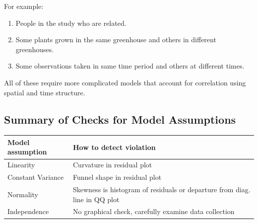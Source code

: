 \documentclass[]{book}
\providecommand{\tightlist}{%
  \setlength{\itemsep}{0pt}\setlength{\parskip}{0pt}}
\begin{document}
For example:

\begin{enumerate}
\def\labelenumi{\arabic{enumi}.}
\tightlist
\item
  People in the study who are related.\\
\item
  Some plants grown in the same greenhouse and others in different
  greenhouses.\\
\item
  Some observations taken in same time period and others at different
  times.
\end{enumerate}

All of these require more complicated models that account for
correlation using spatial and time structure.

\subsection{Summary of Checks for Model
Assumptions}\label{summary-of-checks-for-model-assumptions}

\begin{longtable}[]{@{}ll@{}}
\toprule
\begin{minipage}[b]{0.16\columnwidth}\raggedright\strut
Model assumption\strut
\end{minipage} & \begin{minipage}[b]{0.14\columnwidth}\raggedright\strut
How to detect violation\strut
\end{minipage}\tabularnewline
\midrule
\endhead
\begin{minipage}[t]{0.16\columnwidth}\raggedright\strut
Linearity\strut
\end{minipage} & \begin{minipage}[t]{0.14\columnwidth}\raggedright\strut
Curvature in residual plot\strut
\end{minipage}\tabularnewline
\begin{minipage}[t]{0.16\columnwidth}\raggedright\strut
Constant Variance\strut
\end{minipage} & \begin{minipage}[t]{0.14\columnwidth}\raggedright\strut
Funnel shape in residual plot\strut
\end{minipage}\tabularnewline
\begin{minipage}[t]{0.16\columnwidth}\raggedright\strut
Normality\strut
\end{minipage} & \begin{minipage}[t]{0.14\columnwidth}\raggedright\strut
Skewness is histogram of residuals or departure from diag. line in QQ
plot\strut
\end{minipage}\tabularnewline
\begin{minipage}[t]{0.16\columnwidth}\raggedright\strut
Independence\strut
\end{minipage} & \begin{minipage}[t]{0.14\columnwidth}\raggedright\strut
No graphical check, carefully examine data collection\strut
\end{minipage}\tabularnewline
\bottomrule
\end{longtable}
\end{document}
